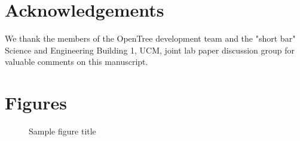 \documentclass{bmcart}
\begin{document}
\begin{backmatter}
\section*{Acknowledgements}
We thank the members of the OpenTree development team and the "short bar" Science
and Engineering Building 1, UCM, joint lab paper discussion group for valuable
comments on this manuscript.







\section*{Figures}
  \begin{figure}[h!]
  \caption{Sample figure title}
\end{figure}


\end{backmatter}
\end{document}
